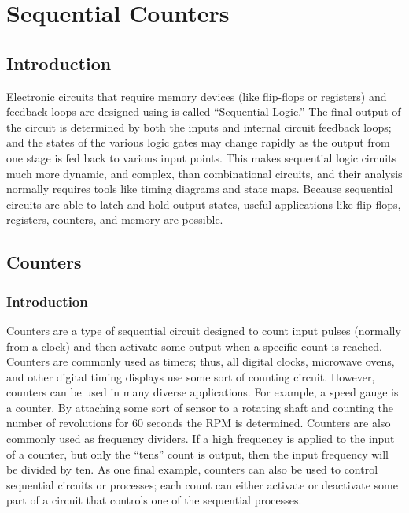 \chapter{Sequential Counters}\label{ch11}
\section{Introduction}

Electronic circuits that require memory devices (like flip-flops or registers) and feedback loops are designed using is called ``Sequential Logic.'' The final output of the circuit is determined by both the inputs and internal circuit feedback loops; and the states of the various logic gates may change rapidly as the output from one stage is fed back to various input points. This makes sequential logic circuits much more dynamic, and complex, than combinational circuits, and their analysis normally requires tools like timing diagrams and state maps. Because sequential circuits are able to latch and hold output states, useful applications like flip-flops, registers, counters, and memory are possible.

\section{Counters}
\label{SL:sec:counters}

\subsection{Introduction}
\label{SL:subsec:intro_to_counters}

Counters are a type of sequential circuit designed to count input pulses (normally from a clock) and then activate some output when a specific count is reached. Counters are commonly used as timers; thus, all digital clocks, microwave ovens, and other digital timing displays use some sort of counting circuit. However, counters can be used in many diverse applications. For example, a speed gauge is a counter. By attaching some sort of sensor to a rotating shaft and counting the number of revolutions for $ 60 $ seconds the \ac{RPM} is determined. Counters are also commonly used as frequency dividers. If a high frequency is applied to the input of a counter, but only the ``tens'' count is output, then the input frequency will be divided by ten. As one final example, counters can also be used to control sequential circuits or processes; each count can either activate or deactivate some part of a circuit that controls one of the sequential processes. 

